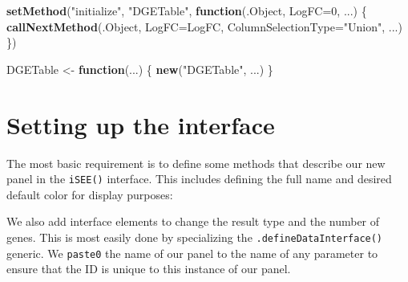 \documentclass[
]{book}
\newenvironment{Shaded}{\begin{snugshade}}{\end{snugshade}}
\newcommand{\ControlFlowTok}[1]{\textcolor[rgb]{0.13,0.29,0.53}{\textbf{#1}}}
\newcommand{\DataTypeTok}[1]{\textcolor[rgb]{0.13,0.29,0.53}{#1}}
\newcommand{\DecValTok}[1]{\textcolor[rgb]{0.00,0.00,0.81}{#1}}
\newcommand{\KeywordTok}[1]{\textcolor[rgb]{0.13,0.29,0.53}{\textbf{#1}}}
\newcommand{\NormalTok}[1]{#1}
\newcommand{\StringTok}[1]{\textcolor[rgb]{0.31,0.60,0.02}{#1}}
\begin{document}
\begin{Shaded}
\begin{Highlighting}[]
\KeywordTok{setMethod}\NormalTok{(}\StringTok{"initialize"}\NormalTok{, }\StringTok{"DGETable"}\NormalTok{, }
    \ControlFlowTok{function}\NormalTok{(.Object, }\DataTypeTok{LogFC=}\DecValTok{0}\NormalTok{, ...) }
\NormalTok{\{}
    \KeywordTok{callNextMethod}\NormalTok{(.Object, }\DataTypeTok{LogFC=}\NormalTok{LogFC, }\DataTypeTok{ColumnSelectionType=}\StringTok{"Union"}\NormalTok{, ...)}
\NormalTok{\})}

\NormalTok{DGETable <-}\StringTok{ }\ControlFlowTok{function}\NormalTok{(...) \{}
    \KeywordTok{new}\NormalTok{(}\StringTok{"DGETable"}\NormalTok{, ...)}
\NormalTok{\}}
\end{Highlighting}
\end{Shaded}

\hypertarget{setting-up-the-interface}{%
\section{Setting up the interface}\label{setting-up-the-interface}}

The most basic requirement is to define some methods that describe our new panel in the \texttt{iSEE()} interface.
This includes defining the full name and desired default color for display purposes:

\begin{Shaded}
\end{Shaded}

We also add interface elements to change the result type and the number of genes.
This is most easily done by specializing the \texttt{.defineDataInterface()} generic.
We \texttt{paste0} the name of our panel to the name of any parameter to ensure that the ID is unique to this instance of our panel.
\end{document}
